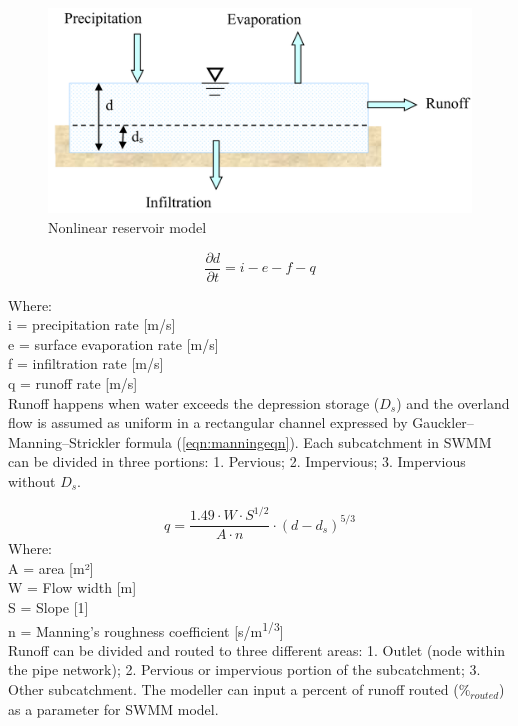 \begin{figure}[ht]
    \centering
	\includegraphics[scale=0.4]{figures/runoffreservoir.png}
	\caption{Nonlinear reservoir model \cite{Rossman2016}}
	\label{fig:runoffreservoir}
\end{figure}

\begin{equation}
\label{eqn:reservoircontinuity}
\frac{\partial d}{\partial t} = i - e - f - q
\end{equation}

Where:\\
i = precipitation rate [m/s]\\
e = surface evaporation rate [m/s]\\
f = infiltration rate [m/s]\\
q = runoff rate [m/s]\\

Runoff happens when water exceeds the depression storage ($D_s$) and the overland flow is assumed as uniform in a rectangular channel expressed by Gauckler–Manning–Strickler formula (\ref{eqn:manningeqn}). Each subcatchment in SWMM can be divided in three portions: 1. Pervious; 2. Impervious; 3. Impervious without $D_s$.

\begin{equation}
\label{eqn:manningeqn}
q =  \frac{1.49 \cdot W \cdot S^{1/2}}{A \cdot n} \cdot (d - d_s)^{5/3} 
\end{equation}
Where: \\
A = area [m²]\\
W = Flow width [m]\\
S = Slope [1]\\
n = Manning's roughness coefficient [s/m\textsuperscript{1/3}] \\

Runoff can be divided and routed to three different areas: 1. Outlet (node within the pipe network); 2. Pervious or impervious portion of the subcatchment; 3. Other subcatchment. The modeller can input a percent of runoff routed ($\%_{routed}$) as a parameter for SWMM model.


